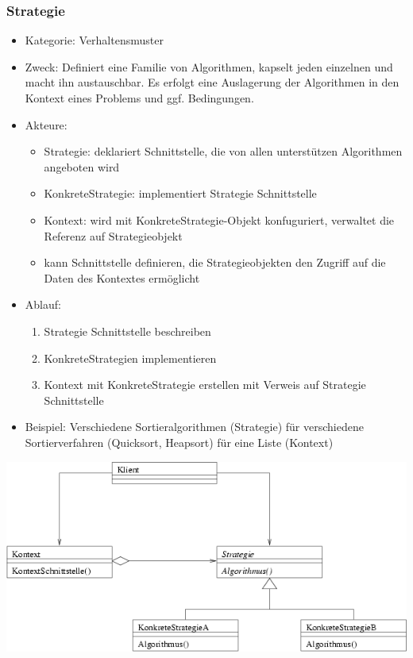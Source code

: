 \documentclass[11pt, fleqn, a4paper, leqno]{scrartcl} %
\begin{document}
		\subsubsection{Strategie}
			\begin{itemize}
				\item Kategorie: Verhaltensmuster
				\item Zweck: Definiert eine Familie von Algorithmen, kapselt jeden einzelnen und macht ihn austauschbar. Es erfolgt eine Auslagerung der Algorithmen in den Kontext eines Problems und ggf. Bedingungen.
				\item Akteure: 
					\begin{itemize}
						\item Strategie: deklariert Schnittstelle, die von allen unterstützen Algorithmen angeboten wird
						\item KonkreteStrategie: implementiert Strategie Schnittstelle
						\item Kontext: wird mit KonkreteStrategie-Objekt konfuguriert, verwaltet die Referenz auf Strategieobjekt
						\item kann Schnittstelle definieren, die Strategieobjekten den Zugriff auf die Daten des Kontextes ermöglicht
					\end{itemize}
				\item Ablauf:
					\begin{enumerate}
						\item Strategie Schnittstelle beschreiben
						\item KonkreteStrategien implementieren
						\item Kontext mit KonkreteStrategie erstellen mit Verweis auf Strategie Schnittstelle
					\end{enumerate}
				\item Beispiel: Verschiedene Sortieralgorithmen (Strategie) für verschiedene Sortierverfahren (Quicksort, Heapsort) für eine Liste (Kontext)
			\end{itemize}
			\includegraphics[scale=0.7]{images/strategie.png}
			\newpage
\end{document}
